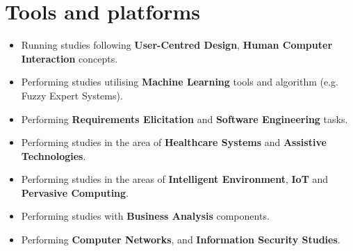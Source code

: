 \documentclass[10pt]{article}
\begin{document}
\section{Tools and platforms}
\begin{itemize}
\item Running studies following \textbf{User-Centred Design}, \textbf{Human Computer Interaction} concepts.
\item Performing studies utilising \textbf{Machine Learning} tools and algorithm (e.g. Fuzzy Expert Systems).
\item Performing \textbf{Requirements Elicitation} and \textbf{Software Engineering} tasks.
\item Performing studies in the area of \textbf{Healthcare Systems} and \textbf{Assistive Technologies}.
\item Performing studies in the areas of \textbf{Intelligent Environment}, \textbf{IoT} and \textbf{Pervasive Computing}.
\item Performing studies with \textbf{Business Analysis} components.
\item Performing \textbf{Computer Networks}, and \textbf{Information Security Studies}.
\end{itemize}
\end{document}
